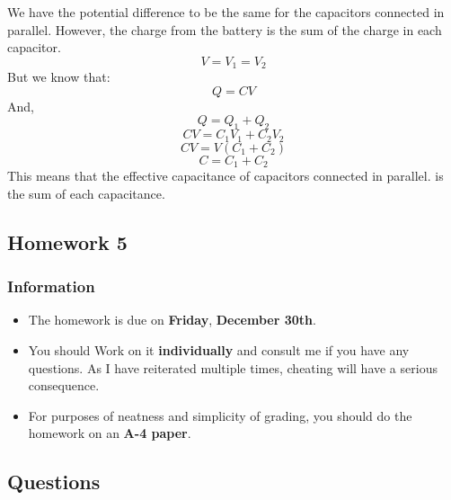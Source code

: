 \documentclass[9pt]{exam}
\begin{document}
	We have the potential difference to be the same for the capacitors connected in parallel. However, the charge from the battery is the sum of the charge in each capacitor.
	$$V = V_1 = V_2$$
	But we know that:
	$$Q=CV$$
	And,
		$$Q = Q_1 + Q_2$$
	$$CV= C_1V_1 + C_2V_2$$
	$$CV = V(C_1+C_2)$$
	$$C = C_1 + C_2$$
	This means that the effective capacitance of capacitors connected in parallel. is the sum of each capacitance.
		\begin{center}
		\section*{Homework 5}
		\subsubsection*{Information}
		\begin{itemize}
			\item The homework is due on \textbf{Friday}, \textbf{December 30th}.
			\item You should Work on it \textbf{individually} and consult me if you have any questions. As I have reiterated multiple times, cheating will have a serious consequence.
			\item For purposes of neatness and simplicity of grading, you should do the homework on an \textbf{A-4 paper}.
		\end{itemize}
	\end{center}
	\begin{center}
		\subsection*{Questions}
	\end{center}
	
\end{document}
